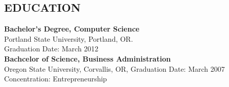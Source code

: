 \documentclass[overlapped]{res}
\begin{document}
\begin{resume}
\section{EDUCATION} 
\begin{multicols}{2}
    \textbf{Bachelor's Degree, Computer Science} \\
    Portland State University, Portland, OR. \\
    Graduation Date: March 2012 \\
    \columnbreak
    \textbf{Bachcelor of Science, Business Administration} \\
    Oregon State University, Corvallis, OR, 
    Graduation Date: March 2007 \\
    Concentration: Entrepreneurship
\end{multicols}


\end{resume}
\end{document}
